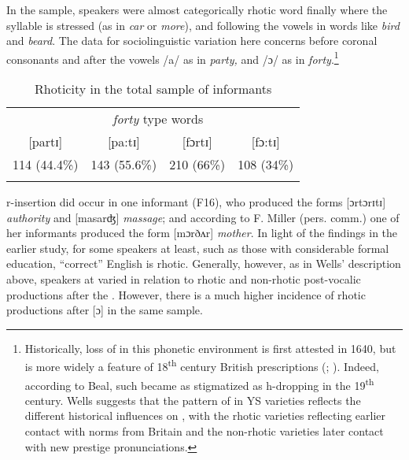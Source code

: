 In the  sample, speakers were almost categorically rhotic word finally where the syllable is stressed (as in \textit{car} or \textit{more}), and following the vowels in words like \textit{bird} and \textit{beard}.  The data for sociolinguistic variation here concerns  before coronal consonants and after the vowels /a/ as in \textit{party,} and /ɔ/ as in \textit{forty}.\footnote{Historically, loss of  in this phonetic environment is first attested in 1640, but is more widely a feature of 18\textsuperscript{th} century British prescriptions (\citealt[164f]{Beal2002}; \citealt[218]{Wells1982a}).  Indeed, according to Beal, such  became as stigmatized as h-dropping in the 19\textsuperscript{th} century.  Wells suggests that the pattern of  in YS varieties reflects the different historical influences on , with the rhotic varieties reflecting earlier contact with norms from Britain and the non-rhotic varieties later contact with new prestige pronunciations.} 

\begin{table}
\begin{tabular}{*{4}{c}}
\lsptoprule
\multicolumn{2}{c}{\textit{party} type words} & \multicolumn{2}{c}{\textit{forty} type words}\\\cmidrule(lr){1-2}\cmidrule(lr){3-4}
{[partɪ]}    &   {[pa:tɪ}] & {[fɔrtɪ}] & {[fɔ:tɪ}]\\\midrule
 114 (44.4\%)   &    143 (55.6\%) & 210 (66\%) & 108 (34\%)\\
\lspbottomrule
\end{tabular}
\caption{Rhoticity in the total sample of informants}
\label{tab:2.12}
\end{table}

r-insertion did occur in one informant (F16), who produced the forms [ɔrtɔrɪtɪ] \textit{authority} and [masarʤ] \textit{massage}; and according to F. Miller (pers. comm.) one of her informants produced the form [mɔrðʌr] \textit{mother}.  In light of the findings in the earlier study, for some  speakers at least, such as those with considerable formal education, “correct” English is rhotic.  Generally, however, as in Wells’ description above, speakers at  varied in relation to rhotic and non-rhotic post-vocalic productions after the .  However, there is a much higher incidence of rhotic productions after [ɔ] in the same sample.   

